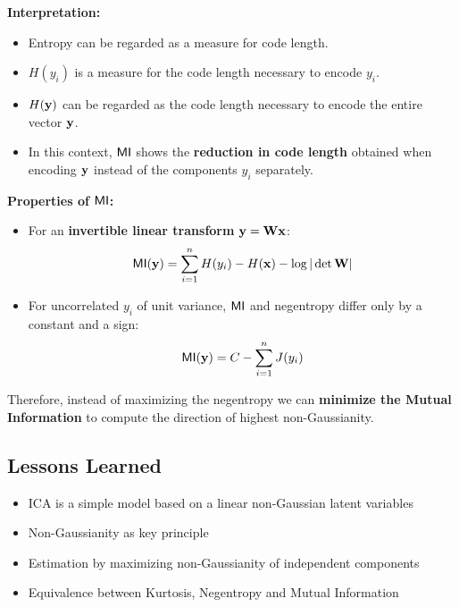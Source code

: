  \textbf{Interpretation:}

  \begin{itemize}
    \item Entropy can be regarded as a measure for code length.            
    \item $H(y_i)$ is a measure for the code length necessary to encode $y_i$.            
    \item $H(\bm{\mathrm{y}})$ can be regarded as the code length necessary to encode the entire vector $\bm{\mathrm{y}}$.                     
    \item In this context, $\mathop{\mathsf{MI}}$ shows the \textbf        {reduction in code length} obtained when encoding $\bm{\mathrm{y}}$ instead of the components $y_i$ separately.
  \end{itemize}
  
 \textbf  {Properties of $\mathop{\mathsf{MI}}$:}

  \begin{itemize}
    \item For an \textbf {invertible linear transform} $\bm{\mathrm{y}} = \mathbf{W} \bm{\mathrm{x}}$:
      \begin{displaymath}
        \mathop{\mathsf{MI}}(\bm{\mathrm{y}}) = \sum_{i=1}^n H(y_i) - H(\bm{\mathrm{x}}) - \log | \det \mathbf{W} |            
      \end{displaymath}
    \item For uncorrelated $y_i$ of unit variance, $\mathop{\mathsf{MI}}$ and negentropy differ only by a constant and a sign:
      \begin{displaymath}
        \mathop{\mathsf{MI}}(\bm{\mathrm{y}}) = C - \sum_{i=1}^n J(y_i)
      \end{displaymath}
  \end{itemize}
 
  Therefore, instead of maximizing the negentropy we can \textbf {minimize the Mutual Information} to compute the direction of highest non-Gaussianity.
 
\subsection{Lessons Learned}
 \begin{itemize}
    \item ICA is a simple model based on a linear non-Gaussian latent variables         
    \item Non-Gaussianity as key principle         
    \item Estimation by maximizing non-Gaussianity of independent components         
    \item Equivalence between Kurtosis, Negentropy and Mutual Information
  \end{itemize}

